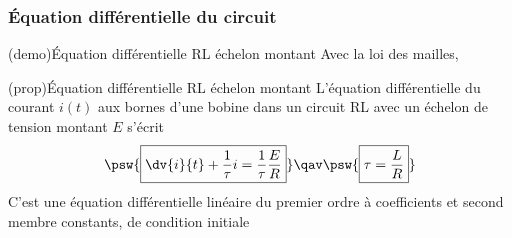 \documentclass[../../main/main.tex]{subfiles}
\begin{document}
\subsubsection{Équation différentielle du circuit}
\begin{tcb}[label=demo:eqdiffrl,
		list entry={\lte\thedemo~:~Équa. diff. RL montant}]
	(demo){Équation différentielle RL échelon montant}
	Avec la loi des mailles,
	\vspace{-25pt}
	\vspace{-15pt}
\end{tcb}
\begin{tcb*}[label=prop:eqdifflc, sidebyside, righthand ratio=.4,
		list entry={\lte\theprop~:~Équa. diff. RL montant}]
	(prop){Équation différentielle RL échelon montant}
	L'équation différentielle du courant $i(t)$ aux bornes d'une bobine
	dans un circuit RL avec un échelon de tension montant $E$ s'écrit
	\[
		\psw{%
			\boxed{\dv{i}{t} + \frac{1}{\tau}i = \frac{1}{\tau}\frac{E}{R}}
		}%
		\qav
		\psw{%
			\boxed{\tau = \frac{L}{R}}
		}%
	\]
	\tcblower
	C'est une équation différentielle linéaire du premier ordre à
	coefficients et second membre constants, de condition initiale
	\psw{%
		\[
			\boxed{i(0^-) = i(0^+) = 0}
		\]
	}%
\end{tcb*}

\end{document}
